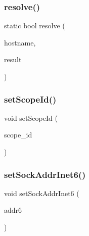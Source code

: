 \subsubsection{\texorpdfstring{resolve()}{resolve()}}
{\footnotesize\ttfamily static bool resolve (\begin{DoxyParamCaption}\item[{\hyperlink{classmuduo_1_1StringArg}{String\+Arg}}]{hostname,  }\item[{\hyperlink{classmuduo_1_1net_1_1InetAddress}{Inet\+Address} $\ast$}]{result }\end{DoxyParamCaption})\hspace{0.3cm}{\ttfamily [static]}}

\mbox{\label{classmuduo_1_1net_1_1InetAddress_a0957796a48a04ac2c1ff03c197d97c38}} 
\subsubsection{\texorpdfstring{set\+Scope\+Id()}{setScopeId()}}
{\footnotesize\ttfamily void set\+Scope\+Id (\begin{DoxyParamCaption}\item[{uint32\+\_\+t}]{scope\+\_\+id }\end{DoxyParamCaption})}

\mbox{\label{classmuduo_1_1net_1_1InetAddress_aba3e8d31ba37537c3cc7dc8e8df86564}} 
\subsubsection{\texorpdfstring{set\+Sock\+Addr\+Inet6()}{setSockAddrInet6()}}
{\footnotesize\ttfamily void set\+Sock\+Addr\+Inet6 (\begin{DoxyParamCaption}\item[{const struct sockaddr\+\_\+in6 \&}]{addr6 }\end{DoxyParamCaption})\hspace{0.3cm}{\ttfamily [inline]}}



